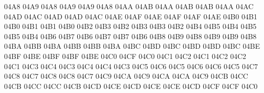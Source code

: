 \setcclcuc 04A8 04A9 04A8 %
\setcclcuc 04A9 04A9 04A8 %
\setcclcuc 04AA 04AB 04AA %
\setcclcuc 04AB 04AB 04AA %
\setcclcuc 04AC 04AD 04AC %
\setcclcuc 04AD 04AD 04AC %
\setcclcuc 04AE 04AF 04AE %
\setcclcuc 04AF 04AF 04AE %
\setcclcuc 04B0 04B1 04B0 %
\setcclcuc 04B1 04B1 04B0 %
\setcclcuc 04B2 04B3 04B2 %
\setcclcuc 04B3 04B3 04B2 %
\setcclcuc 04B4 04B5 04B4 %
\setcclcuc 04B5 04B5 04B4 %
\setcclcuc 04B6 04B7 04B6 %
\setcclcuc 04B7 04B7 04B6 %
\setcclcuc 04B8 04B9 04B8 %
\setcclcuc 04B9 04B9 04B8 %
\setcclcuc 04BA 04BB 04BA %
\setcclcuc 04BB 04BB 04BA %
\setcclcuc 04BC 04BD 04BC %
\setcclcuc 04BD 04BD 04BC %
\setcclcuc 04BE 04BF 04BE %
\setcclcuc 04BF 04BF 04BE %
\setcclcuc 04C0 04CF 04C0 %
\setcclcuc 04C1 04C2 04C1 %
\setcclcuc 04C2 04C2 04C1 %
\setcclcuc 04C3 04C4 04C3 %
\setcclcuc 04C4 04C4 04C3 %
\setcclcuc 04C5 04C6 04C5 %
\setcclcuc 04C6 04C6 04C5 %
\setcclcuc 04C7 04C8 04C7 %
\setcclcuc 04C8 04C8 04C7 %
\setcclcuc 04C9 04CA 04C9 %
\setcclcuc 04CA 04CA 04C9 %
\setcclcuc 04CB 04CC 04CB %
\setcclcuc 04CC 04CC 04CB %
\setcclcuc 04CD 04CE 04CD %
\setcclcuc 04CE 04CE 04CD %
\setcclcuc 04CF 04CF 04C0 %
